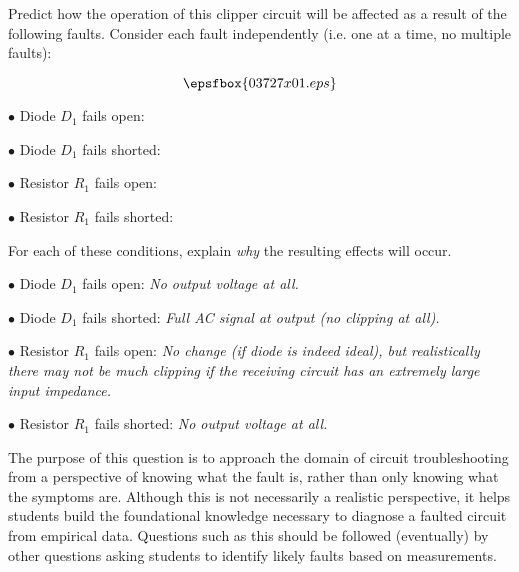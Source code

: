 

Predict how the operation of this clipper circuit will be affected as a result of the following faults.  Consider each fault independently (i.e. one at a time, no multiple faults):

$$\epsfbox{03727x01.eps}$$

\medskip
\item{$\bullet$} Diode $D_1$ fails open:
\vskip 5pt
\item{$\bullet$} Diode $D_1$ fails shorted:
\vskip 5pt
\item{$\bullet$} Resistor $R_1$ fails open:
\vskip 5pt
\item{$\bullet$} Resistor $R_1$ fails shorted:
\medskip

For each of these conditions, explain {\it why} the resulting effects will occur.







\medskip
\item{$\bullet$} Diode $D_1$ fails open: {\it No output voltage at all.}
\vskip 5pt
\item{$\bullet$} Diode $D_1$ fails shorted: {\it Full AC signal at output (no clipping at all).}
\vskip 5pt
\item{$\bullet$} Resistor $R_1$ fails open: {\it No change (if diode is indeed ideal), but realistically there may not be much clipping if the receiving circuit has an extremely large input impedance.}
\vskip 5pt
\item{$\bullet$} Resistor $R_1$ fails shorted: {\it No output voltage at all.}
\medskip







The purpose of this question is to approach the domain of circuit troubleshooting from a perspective of knowing what the fault is, rather than only knowing what the symptoms are.  Although this is not necessarily a realistic perspective, it helps students build the foundational knowledge necessary to diagnose a faulted circuit from empirical data.  Questions such as this should be followed (eventually) by other questions asking students to identify likely faults based on measurements.





